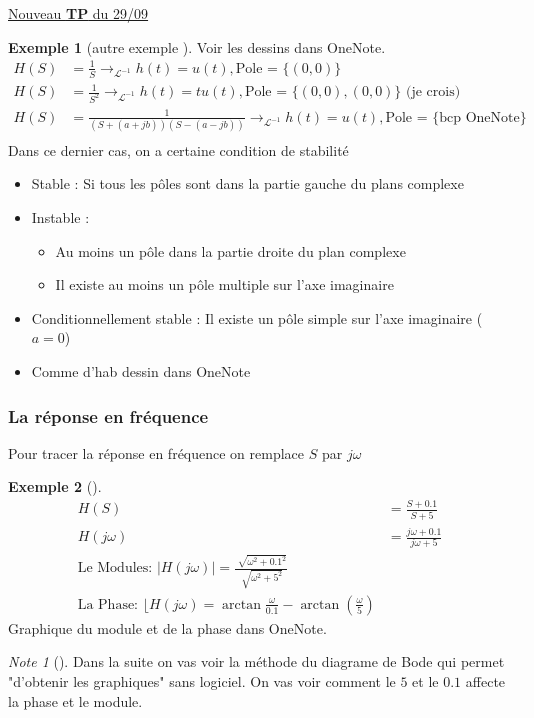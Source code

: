 \documentclass{article}
\theoremstyle{plain}%
\theoremstyle{definition}
\newtheorem{exmp}{Exemple}[section]
\theoremstyle{remark}
\newtheorem*{note}{Note}
\begin{document}
\underline{Nouveau \textbf{TP} du 29/09} \\

\begin{exmp}[autre exemple ]
    Voir les dessins dans OneNote.
    \begin{align}
        H(S) &= \frac{1}{S} \rightarrow_{\mathcal{L}^{-1}} h(t) = u(t), \text{Pole = } \{(0,0)\} \\
        H(S) &= \frac{1}{S^2} \rightarrow_{\mathcal{L}^{-1}} h(t) = tu(t), \text{Pole = } \{(0,0), (0,0)\} \text{ (je crois)} \\
        H(S) &= \frac{1}{(S+(a+jb))(S-(a-jb))} \rightarrow_{\mathcal{L}^{-1}} h(t) = u(t), \text{Pole = } \{\text{bcp OneNote}\} \\
    \end{align}
    Dans ce dernier cas, on a certaine condition de stabilité \begin{itemize}
        \item Stable : Si tous les pôles sont dans la partie gauche du plans complexe
        \item Instable : \begin{itemize}
            \item Au moins un pôle dans la partie droite du plan complexe
            \item Il existe au moins un pôle multiple sur l'axe imaginaire
        \end{itemize}
        \item Conditionnellement stable : Il existe un pôle simple sur l'axe imaginaire ($a=0$)
        \item Comme d'hab dessin dans OneNote
    \end{itemize}
\end{exmp}

\subsubsection{La réponse en fréquence}
Pour tracer la réponse en fréquence on remplace $ S $ par $ j \omega  $ 
\begin{exmp}[]
    \begin{align*}
        H(S) &= \frac{S + 0.1}{S + 5} \\
        H(j \omega ) &= \frac{j \omega  + 0.1}{j \omega + 5} \\
        \text{Le Modules: }\left| H(j \omega ) \right| = \frac{\sqrt[]{\omega ^2 + 0.1^2}}{\sqrt[]{\omega ^2 + 5^2}} \\ 
        \text{La Phase: } \lfloor H(j \omega) = \arctan \frac{\omega }{0.1} - \arctan (\frac{\omega }{5})
    \end{align*}
    Graphique du module et de la phase dans OneNote. 
\end{exmp}
\begin{note}[]
    Dans la suite on vas voir la méthode du diagrame de Bode qui permet "d'obtenir les graphiques" sans logiciel. On vas voir comment le $ 5 $ et le $ 0.1 $ affecte la phase et le module.
\end{note}
\end{document}
